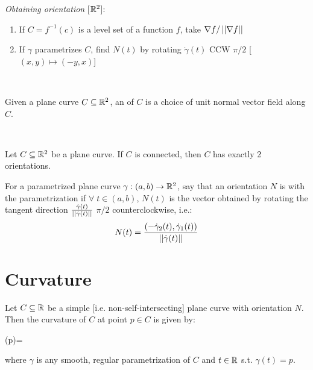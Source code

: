 \documentclass[13pt]{extarticle}
\begin{document}
\newp
\textit{Obtaining orientation} [$\mathbb{R}^2$]: \begin{enumerate}
    \item If $C=f^{-1}(c)$ is a level set of a function $f$, take $\nabla f/\left|\left|\nabla f\right|\right|$
    \item If $\gamma$ parametrizes $C$, find $N(t)$ by rotating $\dot\gamma(t)$ CCW $\pi/2$ [$(x,y)\mapsto(-y,x)$]
\end{enumerate}

~\\[-28pt]
\begin{tcolorbox}[colback=white]
    \begin{definition}
        Given a plane curve $C\subseteq\mathbb{R}^2$, an  of $C$ is a choice of unit normal vector field along $C$.
    \end{definition}
\end{tcolorbox}

~\\[-28pt]
\begin{prop}
    Let $C\subseteq\mathbb{R}^2$ be a plane curve. If $C$ is connected, then $C$ has exactly 2 orientations.
\end{prop}

\begin{definition}
    For a parametrized plane curve $\gamma:(a,b)\to\mathbb{R}^2$, say that an orientation $N$ is  with the parametrization if $\forall\;t\in(a,b)$, $N(t)$ is the vector obtained by rotating the tangent direction $\frac{\dot\gamma(t)}{\left|\left|\dot\gamma(t)\right|\right|}$ $\pi/2$ counterclockwise, i.e.: \begin{align*}
        N(t)=\frac{(-\dot\gamma_2(t),\dot\gamma_1(t))}{\left|\left|\dot\gamma(t)\right|\right|}
    \end{align*}
\end{definition}


\pagebreak
\section{Curvature}
\begin{tcolorbox}[colback=white]
    \begin{definition}
        Let $C\subseteq\mathbb{R}$ be a simple [i.e. non-self-intersecting] plane curve with orientation $N$. Then the curvature of $C$ at point $p\in C$ is given by: \begin{eqnbox}
            \kappa(p)=
        \end{eqnbox}
        where $\gamma$ is any smooth, regular parametrization of $C$ and $t\in\mathbb{R}$ s.t. $\gamma(t)=p$.
    \end{definition}
\end{tcolorbox}
\end{document}
